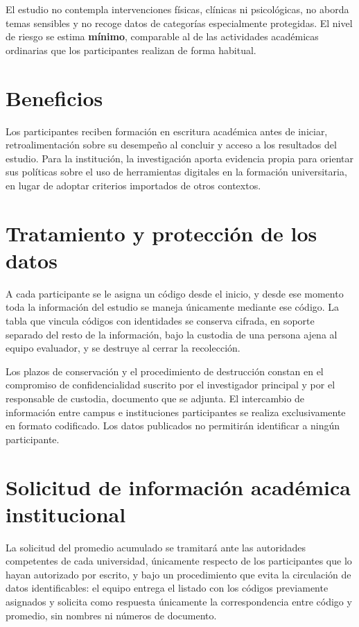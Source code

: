 \documentclass[11pt,a4paper]{article}
\begin{document}
El estudio no contempla intervenciones f\'isicas, cl\'inicas ni psicol\'ogicas, no aborda temas sensibles y no recoge datos de categor\'ias especialmente protegidas. El nivel de riesgo se estima \textbf{m\'inimo}, comparable al de las actividades acad\'emicas ordinarias que los participantes realizan de forma habitual.

\section{Beneficios}

Los participantes reciben formaci\'on en escritura acad\'emica antes de iniciar, retroalimentaci\'on sobre su desempe\~no al concluir y acceso a los resultados del estudio. Para la instituci\'on, la investigaci\'on aporta evidencia propia para orientar sus pol\'iticas sobre el uso de herramientas digitales en la formaci\'on universitaria, en lugar de adoptar criterios importados de otros contextos.

\section{Tratamiento y protecci\'on de los datos}

A cada participante se le asigna un c\'odigo desde el inicio, y desde ese momento toda la informaci\'on del estudio se maneja \'unicamente mediante ese c\'odigo. La tabla que vincula c\'odigos con identidades se conserva cifrada, en soporte separado del resto de la informaci\'on, bajo la custodia de una persona ajena al equipo evaluador, y se destruye al cerrar la recolecci\'on.

Los plazos de conservaci\'on y el procedimiento de destrucci\'on constan en el compromiso de confidencialidad suscrito por el investigador principal y por el responsable de custodia, documento que se adjunta. El intercambio de informaci\'on entre campus e instituciones participantes se realiza exclusivamente en formato codificado. Los datos publicados no permitir\'an identificar a ning\'un participante.

\section{Solicitud de informaci\'on acad\'emica institucional}

La solicitud del promedio acumulado se tramitar\'a ante las autoridades competentes de cada universidad, \'unicamente respecto de los participantes que lo hayan autorizado por escrito, y bajo un procedimiento que evita la circulaci\'on de datos identificables: el equipo entrega el listado con los c\'odigos previamente asignados y solicita como respuesta \'unicamente la correspondencia entre c\'odigo y promedio, sin nombres ni n\'umeros de documento.
\end{document}
